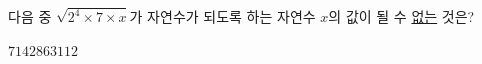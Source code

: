 다음 중 $\sqrt{2^4\times 7\times x}$가 자연수가 되도록 하는 자연수 $x$의 값이 될 수 \underline{없는} 것은?
\begin{choices32}{$7$}{$14$}{$28$}{$63$}{$112$}\end{choices32}
